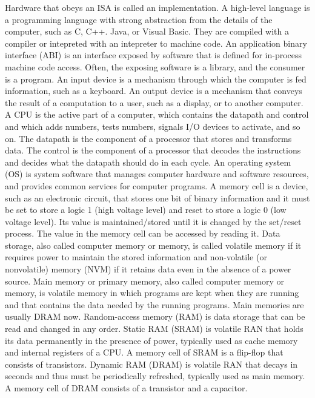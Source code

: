 \documentclass[a4paper,12pt]{report}
\begin{document}
Hardware that obeys an ISA is called an implementation.
A high-level language is a programming language with strong abstraction from the details of the computer, such as C, C++. Java, or Visual Basic. They are compiled with a compiler or intepreted with an intepreter to machine code.
An application binary interface (ABI) is an interface exposed by software that is defined for in-process machine code access. Often, the exposing software is a library, and the consumer is a program.
An input device is a mechanism through which the computer is fed information, such as a keyboard.
An output device is a mechanism that conveys the result of a computation to a user, such as a display, or to another computer.
A CPU is the active part of a computer, which contains the datapath and control and which adds numbers, tests numbers, signals I/O devices to activate, and so on.
The datapath is the component of a processor that stores and transforms data.
The control is the component of a processor that decodes the instructions and decides what the datapath should do in each cycle.
An operating system (OS) is system software that manages computer hardware and software resources, and provides common services for computer programs.
A memory cell is a device, such as an electronic circuit, that stores one bit of binary information and it must be set to store a logic 1 (high voltage level) and reset to store a logic 0 (low voltage level). Its value is maintained/stored until it is changed by the set/reset process. The value in the memory cell can be accessed by reading it.
Data storage, also called computer memory or memory, is called volatile memory if it requires power to maintain the stored information and non-volatile (or nonvolatile) memory (NVM) if it retains data even in the absence of a power source.
Main memory or primary memory, also called computer memory or memory, is volatile memory in which programs are kept when they are running and that contains the data needed by the running programs. Main memories are usually DRAM now.
Random-access memory (RAM) is data storage that can be read and changed in any order.
Static RAM (SRAM) is volatile RAN that holds its data permanently in the presence of power, typically used as cache memory and internal registers of a CPU. A memory cell of SRAM is a flip-flop that consists of transistors.
Dynamic RAM (DRAM) is volatile RAN that decays in seconds and thus must be periodically refreshed, typically used as main memory. A memory cell of DRAM consists of a transistor and a capacitor.
\end{document}
